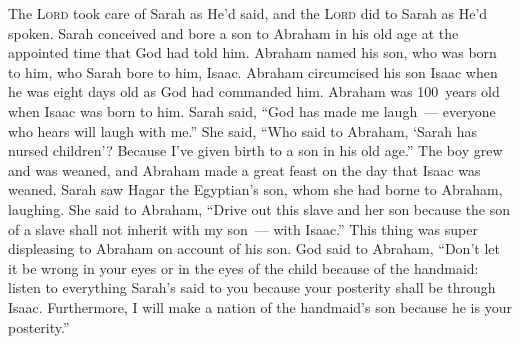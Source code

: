
\begin{inparaenum}
     The \textsc{Lord} took care of Sarah as He'd said, and the \textsc{Lord} did to Sarah as He'd spoken.%
     Sarah conceived and bore a son to Abraham in his old age at the appointed time that God had told him.%
     Abraham named his son, who was born to him, who Sarah bore to him, Isaac.%
     Abraham circumcised his son Isaac when he was eight days old as God had commanded him.%
     Abraham was 100~years old when Isaac was born to him.%
     Sarah said, ``God has made me laugh~--- everyone who hears will laugh with me.''%
     She said, ``Who said to Abraham, `Sarah has nursed children'? Because I've given birth to a son in his old age.''%
     The boy grew and was weaned, and Abraham made a great feast on the day that Isaac was weaned.%
     Sarah saw Hagar the Egyptian's son, whom she had borne to Abraham, laughing.%
     She said to Abraham, ``Drive out this slave and her son because the son of a slave shall not inherit with my son~--- with Isaac.''%
     This\understood{} thing was super displeasing to Abraham on account of his son.%
     God said to Abraham, ``Don't let it be wrong in your eyes or in the eyes of the child because of the handmaid: listen to everything Sarah's said to you because your posterity shall be through Isaac.%
     Furthermore, I will make a nation of the handmaid's son because he is your posterity.''%

\end{inparaenum}
